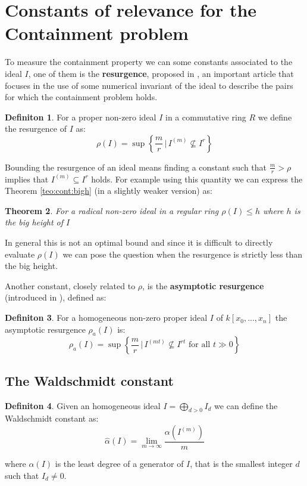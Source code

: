 \documentclass[notitlepage, a4]{book}
\theoremstyle{plain}
\newtheorem{teo}{Theorem}[section]
\theoremstyle{remark}
\theoremstyle{definition}
\newtheorem{deff}[teo]{Definiton}
\newcommand{\cont}[2]{ I^{(#1)} \subseteq I^{#2}}
\newcounter{que}
\begin{document}
\section[Constants of relevance]{Constants of relevance for the Containment problem}
To measure the containment property we can some constants associated to the ideal $ I $, one of them is the \textbf{resurgence}, proposed in \cite{Boc09resurgence}, an important article that focuses in the use of some numerical invariant of the ideal to describe the pairs for which the containment problem holds. 
\begin{deff}
	For a proper non-zero ideal $ I $ in a commutative ring $ R $ we define the resurgence of $ I $ as:
	\begin{equation*}
		\rho(I)= \sup \left\lbrace \frac{m}{r} \, | \, I^{(m)} \not \subseteq I^r \right\rbrace 
	\end{equation*}
\end{deff}
Bounding the resurgence of an ideal means finding a constant such that $ \frac{m}{r} > \rho $ implies that $ \cont{m}{r} $ holds.
For example using this quantity we can express the Theorem \ref{teo:cont:bigh} (in a slightly weaker version) as:
\begin{teo}
	For a radical non-zero ideal in a regular ring $ \rho(I) \leq h $ where $ h $ is the big height of $ I $
\end{teo}
In general this is not an optimal bound and since it is difficult to directly evaluate $ \rho(I) $ we can pose the question when the resurgence is strictly less than the big height. 

Another constant, closely related to $ \rho $, is the \textbf{asymptotic resurgence} (introduced in \cite{Guardo2012}), defined as:
\begin{deff}
	For a homogeneous non-zero proper ideal $ I $ of $ k[x_0 , ... , x_n] $ the asymptotic resurgence $ \rho_a(I) $ is:
	\[ \rho_a(I) = \sup \left\lbrace \frac{m}{r} \, | \, I^{(mt)} \not \subseteq I^{rt} \text{ for all } t \gg 0 \right\rbrace \]
\end{deff}
	
\subsection{The Waldschmidt constant}

\begin{deff}\label{def:walds}
Given an homogeneous ideal $ I = \bigoplus_{d>0} I_d$ we can define the Waldschmidt constant as:
\[
\hat{\alpha}(I) = \lim_{m \to \infty} \frac{\alpha (I^{(m)})   }{m}
\]

where $ \alpha(I) $ is the least degree of a generator of $ I $, that is the smallest integer $ d $ such that $ I_d \neq 0 $.
\end{deff}
\end{document}
